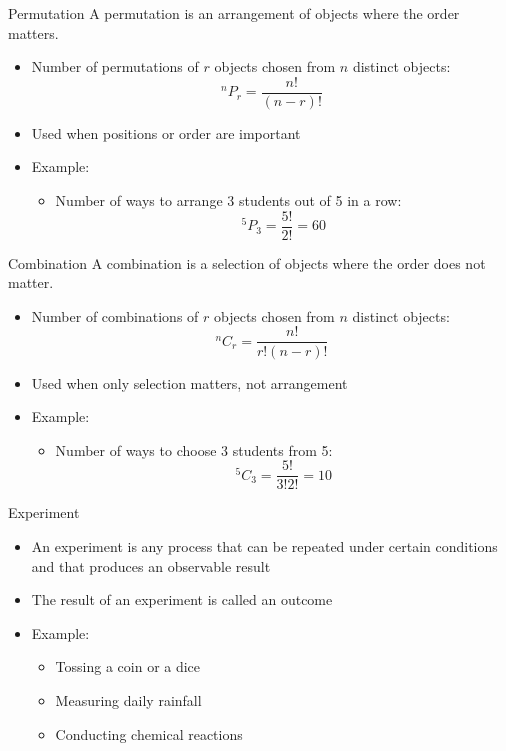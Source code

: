 \documentclass[12pt, aspectratio=169]{beamer}
\begin{document}
	\begin{frame}{Permutation}
		A permutation is an arrangement of objects where the order matters.
		\begin{itemize}
			\item Number of permutations of $r$ objects chosen from $n$ distinct objects:
			\[
				^nP_r = \frac{n!}{(n-r)!}
			\]
			\item Used when positions or order are important
			\item Example:
			\begin{itemize}
				\item Number of ways to arrange 3 students out of 5 in a row:
				\[
					^5P_3 = \frac{5!}{2!} = 60
				\]
			\end{itemize}
		\end{itemize}
	\end{frame}


	\begin{frame}{Combination}
	A combination is a selection of objects where the order does not matter.
		\begin{itemize}
			\item Number of combinations of $r$ objects chosen from $n$ distinct objects:
			\[
				^nC_r = \frac{n!}{r!(n-r)!}
			\]
			\item Used when only selection matters, not arrangement
			\item Example:
			\begin{itemize}
				\item Number of ways to choose 3 students from 5:
				\[
					^5C_3 = \frac{5!}{3!2!} = 10
				\]
			\end{itemize}
		\end{itemize}
	\end{frame}


	\begin{frame}{Experiment}
		\begin{itemize}
			\item An experiment is any process that can be repeated under certain conditions and that produces an observable result
			\item The result of an experiment is called an outcome
			\item Example:
			\begin{itemize}
				\item Tossing a coin or a dice
				\item Measuring daily rainfall
				\item Conducting chemical reactions
			\end{itemize}
		\end{itemize}		
	\end{frame}
\end{document}
